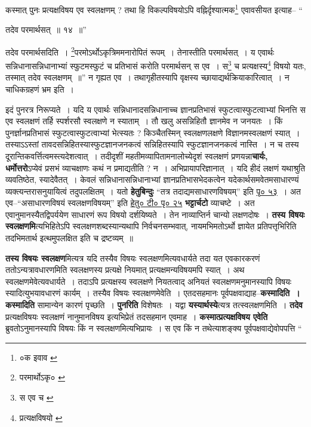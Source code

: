 \documentclass[article,12pt,a4paper]{memoir}
\begin{document}
	कस्मात् पुनः प्रत्यक्षविषय एव स्वलक्षणम् ? तथा हि विकल्पविषयोऽपि वह्निर्दृश्यात्मक\footnote{०क इवाव \cite{dp-msD}} एवावसीयत इत्याह-- “
	  
	तदेव परमार्थसत् ॥ १४ ॥” 
	  
	तदेव परमार्थसदिति । \footnote{परमार्थोऽकृ० \cite{dp-msA} \cite{dp-msB} \cite{dp-msC} \cite{dp-edP} \cite{dp-edH} \cite{dp-edE} \cite{dp-edN}}\-परमोऽर्थोऽकृत्रिममनारोपितं रूपम् । तेनास्तीति परमार्थसत् । य एवार्थः सन्निधानासन्निधानाभ्यां स्फुटमस्फुटं च प्रतिभासं करोति परमार्थसन् स एव । स\footnote{स एव च \cite{dp-msB} \cite{dp-edH} \cite{dp-edE} \cite{dp-edN}} च प्रत्यक्षस्य\footnote{प्रत्यक्षविषयो \cite{dp-msA} \cite{dp-msB} \cite{dp-msC} \cite{dp-msD} \cite{dp-edP} \cite{dp-edH} \cite{dp-edE} \cite{dp-edN}} विषयो यतः, तस्मात् तदेव स्वलक्षणम् ॥” न गृह्यत एव । तथागृहीतस्यापि वृक्षस्य च्छायाद्यर्थक्रियाकारित्वात् । न चाधिकग्रहणं भ्रम इति ।
	\pend
      

	  \pstart इदं पुनरत्र निरूप्यते । यदि य एवार्थः सन्निधानादसन्निधानाच्च ज्ञानप्रतिभासं स्फुटत्वास्फुटत्वाभ्यां भिनत्ति स एव स्वलक्षणं तर्हि स्पर्शरसौ स्वलक्षणे न स्याताम् । तौ खलु असन्निहितौ ज्ञानमेव न जनयतः । किं पुनर्ज्ञानप्रतिभासं स्फुटत्वास्फुटत्वाभ्यां भेत्स्यतः ? किञ्चैतस्मिन् स्वलक्षणलक्षणे विज्ञानमस्वलक्षणं स्यात् । तस्याऽऽस्तां तावदसन्निहितस्यास्फुटज्ञानजनकत्वं सन्निहितस्यापि स्फुटज्ञानजनकत्वं नास्ति । न च तस्य दूरान्तिकवर्त्तित्वमस्त्यदेशत्वात् । तदीदृशीं महतीमव्यापितामनालोच्येदृशं स्वलक्षणं प्रणयन्ना\textbf{चार्यः, धर्मोत्तरो}ऽप्येवं प्रसभं व्याचक्षाणः कथं न प्रमाद्यतीति ? न । अभिप्रायापरिज्ञानात् । यदि हीदं लक्षणं यथाश्रुति व्यवतिष्ठेत, स्यादेवैतत् । केवलं सन्निधानासन्निधानाभ्यां ज्ञानप्रतिभासभेदकत्वेन यदेकार्थसमवेतमसाधारण्यं व्यक्त्यन्तरासनुयायित्वं तदुपलक्षितम् । यतो \textbf{हेतुबिन्दुः} “तत्र तदाद्यमसाधारणविषयम्” इति \href{http://http://sarit.indology.info/?cref=hbṭ.1.28}{पृ० ५३} । अत एव--“असाधारणविषयं स्वलक्षणविषयम्” इति \href{http://http://sarit.indology.info/?cref=hbṭ.1.14}{हेतु० टी० पृ० २५} \textbf{भट्टार्चटो} व्याचष्टे । अत एवानुमानस्यैतद्विपर्ययेण साधारणं रूप विषयो दर्शयिष्यते । तेन नाव्याप्तिर्न चान्यो लक्षणदोषः । \textbf{तस्य विषयः स्वलक्षणमि}त्यभिहितेऽपि स्वलक्षणशब्दस्यान्यथापि निर्वचनसम्भवात्, नायमभिमतोऽर्थो ज्ञायेत प्रतिपत्तृभिरिति तदभिमतार्थ इत्थमुपलक्षित इति च द्रष्टव्यम् ॥
	\pend
      

	  \pstart \textbf{तस्य विषयः स्वलक्षण}मित्यत्र यदि तस्यैव विषयः स्वलक्षणमित्यवधार्यते तदा यत एवकारकरणं ततोऽन्यत्रावधारणमिति स्वलक्षणस्य प्रत्यक्षे नियमात् प्रत्यक्षमन्यविषयमपि स्यात् । अथ स्वलक्षणमेवेत्यवधार्यते । तदाऽपि प्रत्यक्षस्य स्वलक्षणे नियतत्वाद् \leavevmode{} अनियतं स्वलक्षणमनुमानस्यापि विषयः स्यादित्युभयावधारणं कार्यम् । तस्यैव विषयः स्वलक्षणमेवेति । एतदसहमानः पूर्वपक्षवाद्याह--\textbf{कस्मादिति । कस्मादिति} सामान्येन कारणं पृच्छति । \textbf{पुनरिति} विशेषतः । यद्वा \textbf{यस्यार्थस्ये}त्यत्र तत्स्वलक्षणमिति । \textbf{तदेव} प्रत्यक्षविषयः स्वलक्षणं नानुमानविषय इत्यभिप्रेतं तदसहमान एवमाह । \textbf{कस्मात्प्रत्यक्षविषय एवेति} ब्रुवतोऽनुमानस्यापि विषयः किं न स्वलक्षणमित्यभिप्रायः । स एव किं न तथेत्याशङ्क्य पूर्वपक्षवाद्येवोपपत्ति  \leavevmode{} “
	  
\end{document}
